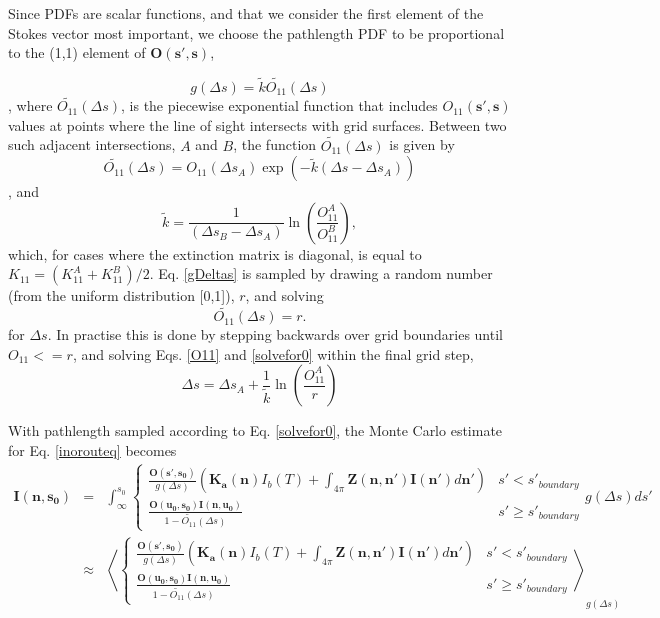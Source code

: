 Since PDFs are scalar functions, and that we consider the first element of the
Stokes vector most important, we choose the pathlength PDF to be proportional to the
(1,1) element of $\mathbf{O(s',s)}$,

\begin{equation}
g(\Delta s)=\tilde{k}\tilde{O_{11}}(\Delta s)
\label{gDeltas}
\end{equation}
, where $\tilde{O_{11}}(\Delta s)$, is the piecewise exponential
function that includes $O_{11}(\mathbf{s',s})$ values at points
where the line of sight intersects with grid surfaces.
Between two such adjacent intersections, $A$ and $B$, the function
$\tilde{O_{11}}(\Delta s)$ is given by
\begin{equation}
\tilde{O_{11}}(\Delta s)=O_{11}(\Delta s_A)\exp\left(-\tilde{k}\left(\Delta s-\Delta
s_A\right)\right)
\label{O11}
\end{equation}
, and
\begin{equation}
\tilde{k}=\frac{1}{\left(\Delta s_B-\Delta s_A\right)}
\ln\left(\frac{O_{11}^A}{O_{11}^B}\right),
\end{equation}
which, for cases where the extinction matrix is diagonal, is equal to
$K_{11}=(K_{11}^A+K_{11}^B)/2$.
Eq. \ref{gDeltas} is sampled by drawing a random number (from the uniform
distribution [0,1]), $r$, and solving
\begin{equation}
\tilde{O_{11}}(\Delta s)=r.
\label{solvefor0}
\end{equation}
for $\Delta s$.  In practise this is done by stepping backwards over
grid boundaries until $O_{11}<=r$, and solving Eqs. \ref{O11} and
\ref{solvefor0} within the final grid step,
\begin{equation}
\Delta s=\Delta s_A+\frac{1}{\tilde{k}}\ln\left(\frac{O_{11}^A}{r}\right)
\end{equation}

With pathlength sampled according to Eq. \ref{solvefor0}, the Monte
Carlo estimate for Eq. \ref{inorouteq} becomes
\begin{eqnarray}
\mathbf{I(n,s_0)}&=&\int^{s_0}_\infty\left\{\begin{array}{rl}
\frac{\mathbf{O(s',s_0)}}{g(\Delta s)}\left(\mathbf{K_a(n)}I_b(T)
+\int_{4\pi}\mathbf{Z(n,n')}\mathbf{I(n')}d\mathbf{n'}\right) & s'< s'_{boundary} \\
\frac{\mathbf{O(u_0,s_0)I(n,u_0)}}{1-\tilde{O_{11}}(\Delta s)} & s'\ge s'_{boundary}
\end{array}g(\Delta s)ds'\right.\nonumber\\
&\approx&\left\langle\left\{\begin{array}{rl}
\frac{\mathbf{O(s',s_0)}}{g(\Delta s)}\left(\mathbf{K_a(n)}I_b(T)
+\int_{4\pi}\mathbf{Z(n,n')}\mathbf{I(n')}d\mathbf{n'}\right) & s'< s'_{boundary} \\
\frac{\mathbf{O(u_0,s_0)I(n,u_0)}}{1-\tilde{O_{11}}(\Delta s)} & s'\ge s'_{boundary}
\end{array}\right.\right\rangle_{g(\Delta s)}
\label{pathlengthint}
\end{eqnarray} 

